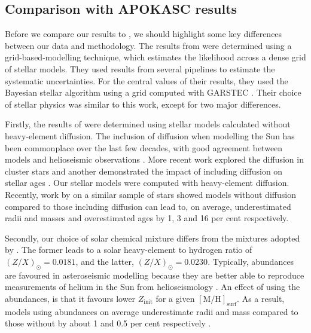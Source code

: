 \documentclass[a4paper,fleqn,usenatbib]{mnras}
\newcommand{\metallicity}{\ensuremath{[\mathrm{M}/\mathrm{H}]}}
\begin{document}
\subsection{Comparison with APOKASC results}\label{sec:comp}

Before we compare our results to , we should highlight some key differences between our data and methodology. The results from  were determined using a grid-based-modelling technique, which estimates the likelihood across a dense grid of stellar models. They used results from several pipelines to estimate the systematic uncertainties. For the central values of their results, they used the Bayesian stellar algorithm \citep[BASTA;][]{SilvaAguirre.Davies.ea2015} using a grid computed with GARSTEC \citep{Weiss.Schlattl2008}. Their choice of stellar physics was similar to this work, except for two major differences.

Firstly, the results of  were determined using stellar models calculated without heavy-element diffusion. The inclusion of diffusion when modelling the Sun has been commonplace over the last few decades, with good agreement between models and helioseismic observations \citep{Christensen-Dalsgaard.Proffitt.ea1993, Bahcall.Pinsonneault.ea1995}. More recent work explored the diffusion in cluster stars \citep{Korn.Grundahl.ea2007, Onehag.Gustafsson.ea2014} and another demonstrated the impact of including diffusion on stellar ages \citep{Dotter.Conroy.ea2017}. Our stellar models were computed with heavy-element diffusion. Recently, work by \citet{Nsamba.Campante.ea2018} on a similar sample of stars showed models without diffusion compared to those including diffusion can lead to, on average, underestimated radii and masses and overestimated ages by 1, 3 and 16 per cent respectively.

Secondly, our choice of \citet{Asplund.Grevesse.ea2009} solar chemical mixture differs from the \citet{Grevesse.Sauval1998} mixtures adopted by . The former leads to a solar heavy-element to hydrogen ratio of $(Z/X)_\odot = 0.0181$, and the latter, $(Z/X)_\odot = 0.0230$. Typically, \citet{Grevesse.Sauval1998} abundances are favoured in asteroseismic modelling because they are better able to reproduce measurements of helium in the Sun from helioseismology \citep{Serenelli.Basu.ea2009}. An effect of using the \citet{Asplund.Grevesse.ea2009} abundances, is that it favours lower $Z_\mathrm{init}$ for a given $\metallicity_\mathrm{surf}$. As a result, models using \citet{Grevesse.Sauval1998} abundances on average underestimate radii and mass compared to those without by about 1 and 0.5 per cent respectively \citep{Nsamba.Campante.ea2018}.
\end{document}
